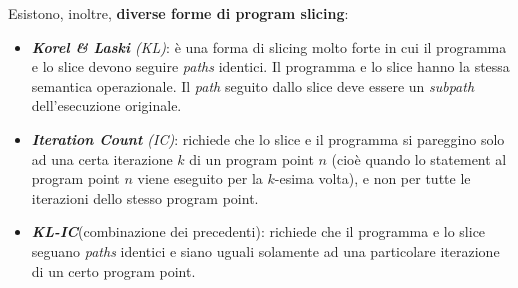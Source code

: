 \documentclass[a4paper, 11pt]{report}
\begin{document}
	\noindent
	Esistono, inoltre, \textbf{diverse forme di program slicing}:
	\begin{itemize}
		\item \textit{\textbf{Korel \& Laski} (KL)}: è una forma di slicing molto forte in cui il programma e lo slice devono seguire \textit{paths} identici. Il programma e lo slice hanno la stessa semantica operazionale. Il \textit{path} seguito dallo slice deve essere un \textit{subpath} dell'esecuzione originale.
		\item \textit{\textbf{Iteration Count} (IC)}: richiede che lo slice e il programma si pareggino solo ad una certa iterazione $k$ di un program point $n$ (cioè quando lo statement al program point $n$ viene eseguito per la $k$-esima volta), e non per tutte le iterazioni dello stesso program point.
		\item \textit{\textbf{KL-IC}}(combinazione dei precedenti): richiede che il programma e lo slice seguano \textit{paths} identici e siano uguali solamente ad una particolare iterazione di un certo program point.
	\end{itemize}


	
\end{document}
